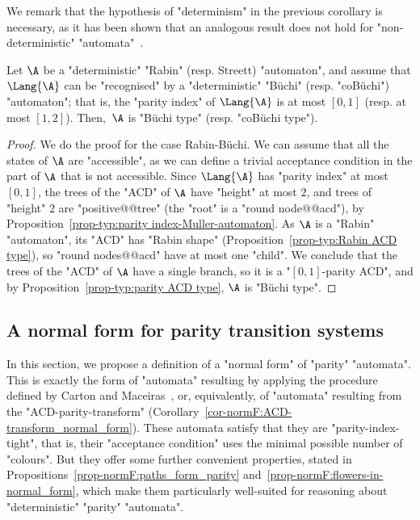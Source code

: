\documentclass[10pt,a4paper]{amsart}
\begin{document}
We remark that the hypothesis of "determinism" in the previous corollary is necessary, as it has been shown that an analogous result does not hold for "non-deterministic" "automata"~\cite{BKS10Paritizing}.




\begin{proposition}
	Let $\A$ be a "deterministic" "Rabin" (resp. Streett) "automaton", and assume that $\Lang{\A}$ can be "recognised" by a "deterministic" "B\"uchi" (resp. "coB\"uchi") "automaton"; that is, the "parity index" of $\Lang{\A}$ is at most $[0,1]$ (resp. at most $[1,2]$). Then,~$\A$ is "B\"uchi type" (resp. "coB\"uchi type").
\end{proposition}
\begin{proof}
	We do the proof for the case Rabin-B\"uchi. We can assume that all the states of $\A$ are "accessible", as we can define a trivial acceptance condition in the part of $\A$ that is not accessible.  Since $\Lang{\A}$ has "parity index" at most $[0,1]$, the trees of the "ACD" of $\A$ have "height" at most $2$, and trees of "height" $2$ are "positive@@tree" (the "root" is a "round node@@acd"), by Proposition~\ref{prop-typ:parity index-Muller-automaton}. As $\A$ is a "Rabin" "automaton", its "ACD" has "Rabin shape" (Proposition~\ref{prop-typ:Rabin ACD type}), so "round nodes@@acd" have at most one "child". We conclude that the trees of the "ACD" of $\A$ have a single branch, so it is a "$[0,1]$-parity ACD", and by Proposition~\ref{prop-typ:parity ACD type}, $\A$ is "B\"uchi type".
\end{proof}




\subsection{A normal form for parity transition systems}\label{subsec-corollaries: normal-form}
In this section, we propose a definition of a "normal form" of "parity" "automata". This is exactly the form of "automata" resulting by applying the procedure defined by Carton and Maceiras~\cite{CartonMaceiras99RabinIndex}, or, equivalently, of "automata" resulting from the "ACD-parity-transform" (Corollary~\ref{cor-normF:ACD-transform_normal_form}). These automata satisfy that they are "parity-index-tight", that is, their "acceptance condition" uses the minimal possible number of "colours". But they offer some further convenient properties, stated in Propositions~\ref{prop-normF:paths_form_parity} and~\ref{prop-normF:flowers-in-normal_form}, which make them particularly well-suited for reasoning about "deterministic" "parity" "automata".
\end{document}
